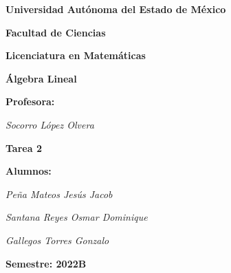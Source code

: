 \documentclass[fleqn]{article}
\begin{document}
    \begin{titlepage}
        \centering
        {\Huge \textbf{Universidad Autónoma del Estado de México}\par}
        \vspace{0.9cm}

        {\Huge \textbf{Facultad de Ciencias}\par}
        \vspace{0.9cm}

        {\Huge \textbf{Licenciatura en Matemáticas}\par}
        \vspace{1.8cm}

        {\huge \textbf{Álgebra Lineal}\par}
        \vspace{0.7cm}

        {\huge \textbf{Profesora:}\par}
        \vspace{0.3cm}
        {\huge \textsl{Socorro López Olvera}}\par
        \vspace{0.7cm}

        {\huge \textbf{Tarea 2}\par}
        \vspace{0.7cm}

        {\huge \textbf{Alumnos:}\par}
        \vspace{0.3cm}
        {\huge \textsl{Peña Mateos Jesús Jacob}}\par
        \vspace{1.5mm}
        {\huge \textsl{Santana Reyes Osmar Dominique}}\par
        {\huge \textsl{Gallegos Torres Gonzalo}}\par
        \vspace{1.8cm}

        {\huge \textbf{Semestre: 2022B}\par}
        \vspace{0.7cm}
        \vfill
        \par
    \end{titlepage}
\end{document}
